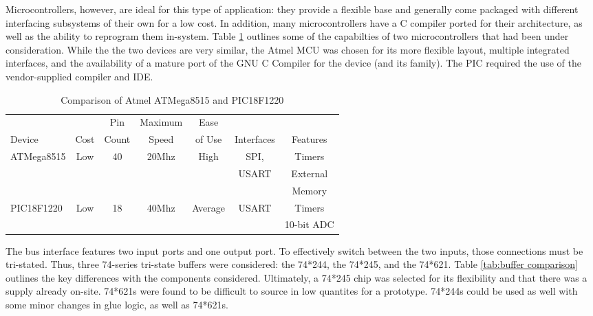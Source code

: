 Microcontrollers, however, are ideal for this type of application: they provide
 a flexible base and generally come packaged with different interfacing 
subsystems of their own for a low cost. In addition, many microcontrollers 
have a C compiler ported for their architecture, as well as the ability to
 reprogram them in-system. Table \ref{tab:MCU capabilities} outlines some of
 the capabilties of two microcontrollers that had been under consideration.
 While the the two devices are very similar, the Atmel MCU was chosen for its
 more flexible layout, multiple integrated interfaces, and the availability
 of a mature port of the GNU C Compiler for the device (and its family). The 
PIC required the use of the vendor-supplied compiler and IDE.
\begin{table}[bp]
\caption[Atmel and PIC MCUs]{Comparison of Atmel ATMega8515\cite{ds:ATMEGA8515
} and PIC18F1220\cite{ds:pic18f1220}\cite{web:pic18f1220}}
\begin{tabular}{l| c c c c c c}
\setlength{\tabcolsep}{1pt}
	       &      & \small{Pin}  & \small{Maximum} & \small{Ease}   &            &         \\
	\small{Device} & \small{Cost} & \small{Count} & \small{Speed}  & \small{of Use} 
	& \small{Interfaces} & \small{Features}\\\hline
	\multirow{3}{*}{\small{ATMega8515}} & \multirow{3}{*}{\small{Low}} & \multirow{3}{*}{\small{40}}
	& \multirow{3}{*}{\small{20Mhz}} & \small{High} 
	& \small{SPI,} & \small{Timers}\\
	           &     &    &       &      &\small{USART} & \small{External}\\
	& & & & & &\small{Memory}\\\hline
	\small{PIC18F1220} & \small{Low} & \small{18} & \small{40Mhz} & \small{Average} & 
	\small{USART} & \small{Timers} \\
	           &     &    &       &      &  & \small{10-bit ADC}\\
\end{tabular}
\label{tab:MCU capabilities}
\end{table}

The bus interface features two input ports and one output port. To effectively
 switch between the two inputs, those connections must be tri-stated. Thus, three 
74-series tri-state buffers were considered: the 74*244, the 74*245, and the 
74*621. Table \ref{tab:buffer comparison} outlines the key differences with 
the components considered. Ultimately, a 74*245 chip was selected for its 
flexibility and that there was a supply already on-site. 74*621s were found 
to be difficult to source in low quantites for a prototype. 74*244s could be 
used as well with some minor changes in glue logic, as well as 74*621s.


